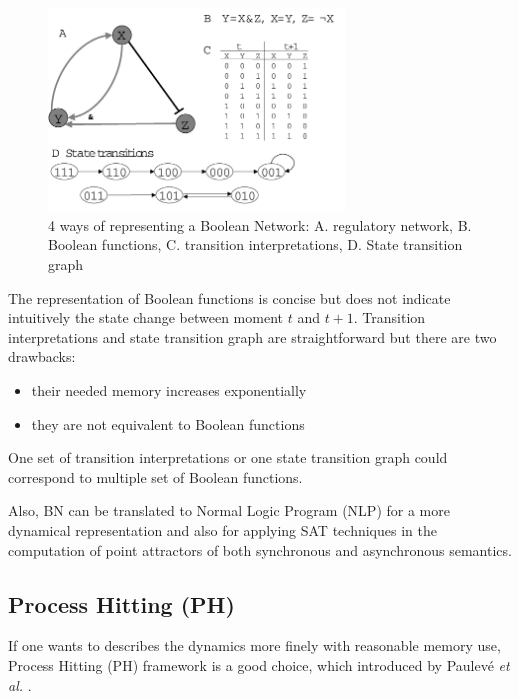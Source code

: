 \begin{figure}[ht]
    \centering
    \includegraphics[width=0.7\textwidth]{BooleanNetwork.png}
    \caption[Boolean Network]{4 ways of representing a Boolean Network: A. regulatory network, B. Boolean functions, C. transition interpretations, D. State transition graph}
    \label{fig:booleannetwork}
\end{figure}

The representation of Boolean functions is concise but does not indicate intuitively the state change between moment $t$ and $t+1$.
Transition interpretations and state transition graph are straightforward but there are two drawbacks: 
\begin{itemize}
    \item their needed memory increases exponentially
    \item they are not equivalent to Boolean functions
\end{itemize}
One set of transition interpretations or one state transition graph could correspond to multiple set of Boolean functions.

Also, BN can be translated to Normal Logic Program (NLP) \cite{inoue2011logic} for a more dynamical representation and also for applying SAT techniques in the computation of point attractors of both synchronous and asynchronous semantics.


\subsection{Process Hitting (PH)}
If one wants to describes the dynamics more finely with reasonable memory use, Process Hitting (PH) framework is a good choice, which introduced by Paulev\'e \textit{et al.} \cite{pauleve2011}.


